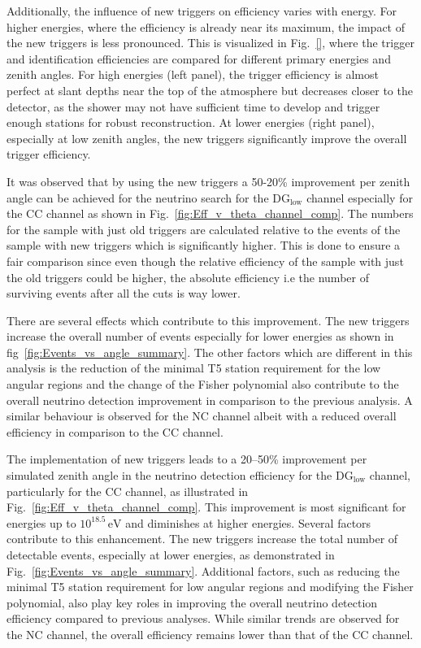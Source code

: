 Additionally, the influence of new triggers on efficiency varies with energy. For higher energies, where the efficiency is already near its maximum, the impact of the new triggers is less pronounced. This is visualized in Fig.~\ref{}, where the trigger and identification efficiencies are compared for different primary energies and zenith angles. For high energies (left panel), the trigger efficiency is almost perfect at slant depths near the top of the atmosphere but decreases closer to the detector, as the shower may not have sufficient time to develop and trigger enough stations for robust reconstruction. At lower energies (right panel), especially at low zenith angles, the new triggers significantly improve the overall trigger efficiency.

It was observed that by using the new triggers a 50-20\% improvement per zenith angle can be achieved for the neutrino search for the DG$\mathrm{_{low}}$ channel especially for the CC channel as shown in Fig.~\ref{fig:Eff_v_theta_channel_comp}. The numbers for the sample with just old triggers are calculated relative to the events of the sample with new triggers which is significantly higher. This is done to ensure a fair comparison since even though the relative efficiency of the sample with just the old triggers could be higher, the absolute efficiency i.e the number of surviving events after all the cuts is way lower. 

There are several effects which contribute to this improvement. The new triggers increase the overall number of events especially for lower energies as shown in fig~\ref{fig:Events_vs_angle_summary}. The other factors which are different in this analysis is the reduction of the minimal T5 station requirement for the low angular regions and the change of the Fisher polynomial also contribute to the overall neutrino detection improvement in comparison to the previous analysis. A similar behaviour is observed for the NC channel albeit with a reduced overall efficiency in comparison to the CC channel. 

The implementation of new triggers leads to a 20--50\% improvement per simulated zenith angle in the neutrino detection efficiency for the DG$_{\mathrm{low}}$ channel, particularly for the CC channel, as illustrated in Fig.~\ref{fig:Eff_v_theta_channel_comp}. This improvement is most significant for energies up to \(10^{18.5}\,\mathrm{eV}\) and diminishes at higher energies. Several factors contribute to this enhancement. The new triggers increase the total number of detectable events, especially at lower energies, as demonstrated in Fig.~\ref{fig:Events_vs_angle_summary}. Additional factors, such as reducing the minimal T5 station requirement for low angular regions and modifying the Fisher polynomial, also play key roles in improving the overall neutrino detection efficiency compared to previous analyses. While similar trends are observed for the NC channel, the overall efficiency remains lower than that of the CC channel.






